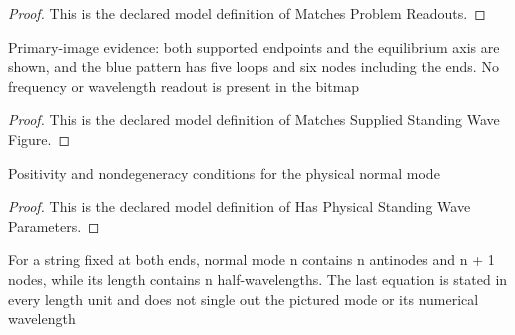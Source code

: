 \begin{proof}
  This is the declared model definition of Matches Problem Readouts.
\end{proof}
\begin{definition}
  \label{def:physics:phyx-mini-0177:phyxminiproblems-problemphyxmini0177-matchessuppliedstandingwavefigure}
  Primary-image evidence: both supported endpoints and the equilibrium axis are shown, and the blue pattern has five loops and six nodes including the ends. No frequency or wavelength readout is present in the bitmap
\end{definition}
\begin{proof}
  This is the declared model definition of Matches Supplied Standing Wave Figure.
\end{proof}
\begin{definition}
  \label{def:physics:phyx-mini-0177:phyxminiproblems-problemphyxmini0177-hasphysicalstandingwaveparameters}
  Positivity and nondegeneracy conditions for the physical normal mode
\end{definition}
\begin{proof}
  This is the declared model definition of Has Physical Standing Wave Parameters.
\end{proof}
\begin{definition}
  \label{def:physics:phyx-mini-0177:phyxminiproblems-problemphyxmini0177-satisfiesfixedendstandingwavemodelaw}
  For a string fixed at both ends, normal mode n contains n antinodes and n + 1 nodes, while its length contains n half-wavelengths. The last equation is stated in every length unit and does not single out the pictured mode or its numerical wavelength
\end{definition}
